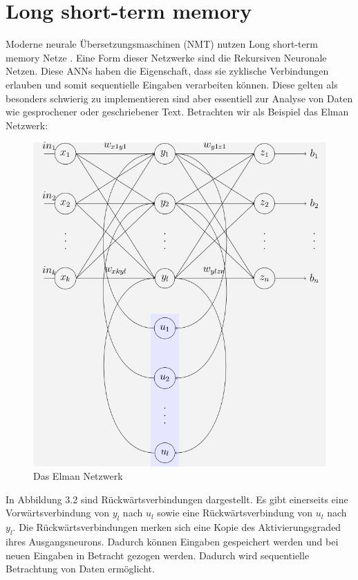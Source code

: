 \documentclass{thesisclass}
\begin{document}
\section{Long short-term memory}
Moderne neurale Übersetzungsmaschinen (\gls{NMT}) nutzen Long short-term memory Netze  \cite{DBLP:journals/corr/WuSCLNMKCGMKSJL16}. Eine Form dieser Netzwerke sind die Rekursiven Neuronale Netzen. Diese \gls{ANN}s haben die Eigenschaft, dass sie zyklische Verbindungen erlauben und somit sequentielle Eingaben verarbeiten können. Diese gelten als besonders schwierig zu implementieren sind aber essentiell zur Analyse von Daten wie gesprochener oder geschriebener Text. Betrachten wir als Beispiel das Elman Netzwerk:
\begin{figure}[H]
		\center
  		\includegraphics[scale=0.55]{images/Elman_RNN.png}
  		\caption{Das Elman Netzwerk\cite{Elman}}
  		\label{fig:Elman Netzwerk}
\end{figure}
In Abbildung 3.2 sind Rückwärtsverbindungen dargestellt. Es gibt einerseits eine Vorwärtsverbindung von $y_l$ nach $u_l$ sowie eine Rückwärtsverbindung von $u_l$ nach $y_l$.  Die Rückwärtsverbindungen merken sich eine Kopie des Aktivierungsgraded ihres Ausgangsneurons. Dadurch können Eingaben gespeichert werden und bei neuen Eingaben in Betracht gezogen werden. Dadurch wird sequentielle Betrachtung von Daten ermöglicht.
\end{document}
